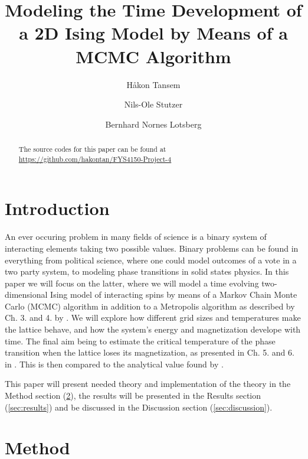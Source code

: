 \documentclass[twocolumn]{aastex62}
\begin{document}
\title{\Large Modeling the Time Development of a 2D Ising Model by Means of a MCMC Algorithm}

\author{Håkon Tansem}

\author{Nils-Ole Stutzer}

\author{Bernhard Nornes Lotsberg}

\begin{abstract}
	

	The source codes for this paper can be found at \url{https://github.com/hakontan/FYS4150-Project-4}

\end{abstract}

\section{Introduction} \label{sec:intro}
An ever occuring problem in many fields of science is a binary system of
interacting elements taking two possible values. Binary problems can be found in
everything from political science, where one could model outcomes of a vote in a
two party system, to modeling phase transitions in solid states physics. In this
paper we will focus on the latter, where we will model a time evolving
two-dimensional Ising model of interacting spins by means of a Markov Chain
Monte Carlo (MCMC) algorithm in addition to a Metropolis algorithm as described
by Ch. 3. and 4. by \cite{newman:2019}. We will explore how
different grid sizes and temperatures make the lattice behave, and how the system's energy and magnetization
develope with time. The final aim being to estimate the critical temperature of
the phase transition when the lattice loses its magnetization, as presented in
Ch. 5. and 6. in \cite{plischke:2006}. This is then
compared to the analytical value found by \cite{onsager:1944}.

This paper will present needed theory and implementation of the theory in the Method
section (\ref{sec:method}), the results will be presented in the Results section
(\ref{sec:results}) and be discussed in the Discussion section
(\ref{sec:discussion}).

\section{Method} \label{sec:method}
\end{document}
